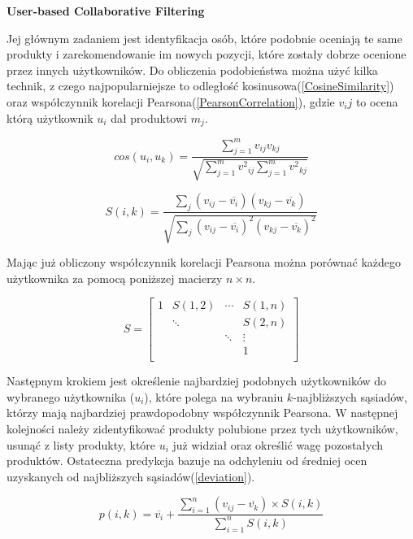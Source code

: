 \textbf{User-based Collaborative Filtering}

Jej głównym zadaniem jest identyfikacja osób, które podobnie oceniają te same produkty i zarekomendowanie im nowych pozycji, które zostały dobrze ocenione przez innych użytkowników. Do obliczenia podobieństwa można użyć kilka technik, z czego najpopularniejsze to odległość kosinusowa(\ref{CosineSimilarity}) oraz współczynnik korelacji Pearsona(\ref{PearsonCorrelation}), gdzie $v_ij$ to ocena którą użytkownik $u_i$ dał produktowi $m_j$.

\begin{equation}
\label{CosineSimilarity}
cos(u_i,u_k) = \frac{
\sum_{j=1}^{m} v_{ij}v_{kj}
}{
\sqrt{
\sum_{j=1}^{m}{v^2}_{ij} \sum_{j=1}^{m}{v^2}_{kj} 
}
}
\end{equation}

\begin{equation}
\label{PearsonCorrelation}
S(i,k) = \frac{
	\sum_{j} (v_{ij} - \overline{v_i}) (v_{kj} - \overline{v_k})
}{
	\sqrt{
		\sum_{j} (v_{ij} - \overline{v_i})^2 (v_{kj} - \overline{v_k})^2
	}
}
\end{equation}

Mając już obliczony współczynnik korelacji Pearsona można porównać każdego użytkownika za pomocą poniższej macierzy $n \times n$.

$$
S= \left[
\begin{array}{cccc}
1 & S(1,2) & \cdots & S(1,n) \\
 &  \ddots &   &  S(2,n) \\
 &   & \ddots  &  \vdots \\
 &   &   & 1  \\

\end{array}
\right]
$$

Następnym krokiem jest określenie najbardziej podobnych użytkowników do wybranego użytkownika ($u_i$), które polega na wybraniu $k$-najbliższych sąsiadów, którzy mają najbardziej prawdopodobny współczynnik Pearsona. W następnej kolejności należy zidentyfikować produkty polubione przez tych użytkowników, usunąć z listy produkty, które $u_i$ już widział oraz określić wagę pozostałych produktów. Ostateczna predykcja bazuje na odchyleniu od średniej ocen uzyskanych od najbliższych sąsiadów(\ref{deviation}).

\begin{equation}
\label{deviation}
p(i,k) = \overline{v_i} + 
\frac{
	\sum_{i=1}^{n} (v_{ij} - \overline{v_k}) \times S(i,k)
}{
	\sum_{i=1}^{n} S(i,k)
}
\end{equation}
 

